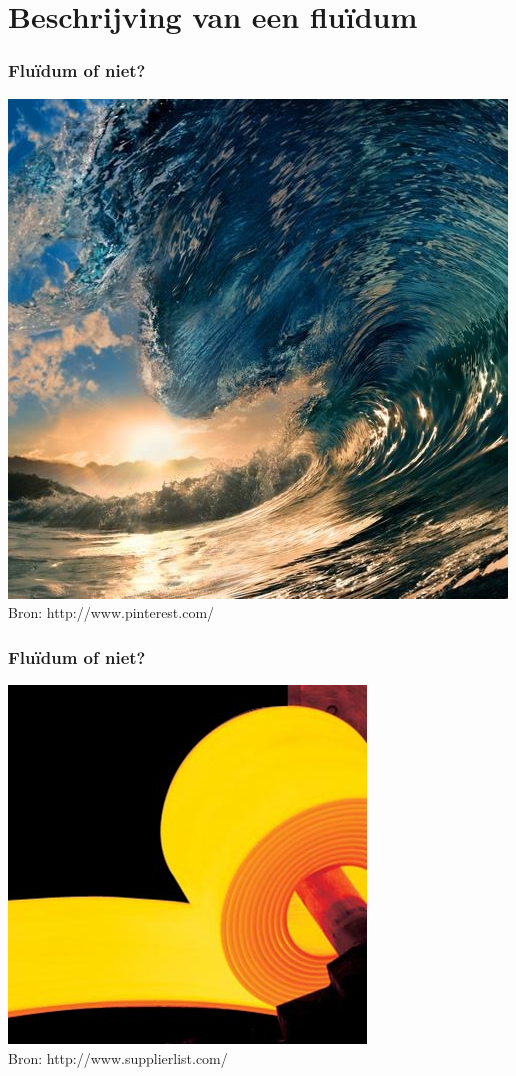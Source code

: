 \documentclass[t]{beamer}
\begin{document}
	\section{Beschrijving van een fluïdum}
		\begin{frame}
			\frametitle{Fluïdum of niet?}
			\center
    		\includegraphics[height=0.8\textheight]{fig/basisbegrippen/golf.png}\\
			\footnotesize{Bron: http://www.pinterest.com/}
  		\end{frame}
  		\begin{frame}
  			\frametitle{Fluïdum of niet?}
			\center
    		\includegraphics[height=0.8\textheight]{fig/basisbegrippen/staal.png}\\
			\footnotesize{Bron: http://www.supplierlist.com/}
  		\end{frame}
\end{document}
